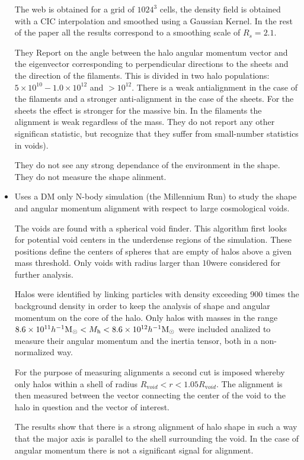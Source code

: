 \documentclass[useAMS,usenatbib]{mn2e}
\newcommand{\hMpc}{{\ifmmode{h^{-1}{\rm Mpc}}\else{$h^{-1}$Mpc }\fi}}
\newcommand{\hMsun}{{\ifmmode{h^{-1}{\rm
        {M_{\odot}}}}\else{$h^{-1}{\rm{M_{\odot}}}$~}\fi}}
\begin{document}
\begin{itemize}
The web is obtained for a grid of $1024^3$ cells, the density field is
obtained with a CIC interpolation and smoothed using a Gaussian
Kernel. In the rest of the paper all the results correspond to a
smoothing scale of $R_{s}=2.1$\hMpc.


They Report on the angle between the halo
angular momentum vector and the eigenvector corresponding to
perpendicular directions to the sheets and the direction of the
filaments. This is divided in two halo populations: $5\times 10^{10} -
1.0\times 10^{12}$ and $>10^{12}$. There is a weak antialignment in
the case of the filaments and a stronger anti-alignment in the case of
the sheets. For the sheets the effect is stronger for the massive
bin. In the filaments the alignment is weak regardless of the
mass. They do not report any other significan statistic, but recognize
that they suffer from small-number statistics in voids).


They do not see any strong dependance of the environment in the
shape. They do not measure the shape alinment.

\item
\citep{Brunino2007}
Uses a DM only N-body simulation (the Millennium Run) to study the
shape and angular momentum alignment with respect to large
cosmological voids. 

The voids are found with a spherical void finder. This algorithm first
looks for potential void centers in the underdense regions of the
simulation. These positions define the centers of spheres that are
empty of halos above a given mass threshold. Only voids with radius
larger than $10$\hMpc were considered for further analysis.

Halos were identified by linking particles with density exceeding 900
times the background density in order to keep the analysis of shape
and angular momentum on the core of the halo. Only halos with masses
in the range $8.6\times 10^{11}\hMsun < M_{\mathrm h}< 8.6\times
10^{12}\hMsun$ were included analized to measure their angular
momentum and the inertia tensor, both in a non-normalized way.

For the purpose of measuring alignments a second cut is imposed
whereby only halos within a shell of radius $R_{\mathrm void}<r<1.05R_{\mathrm
void}$. The alignment is then measured between the vector connecting
the center of the void to the halo in question and the vector of
interest.

The results show that there is a strong alignment of halo shape in
such a way that the major axis is parallel to the shell surrounding
the void. In the case of angular momentum there is not a significant
signal for alignment.





\end{itemize}
\end{document}
